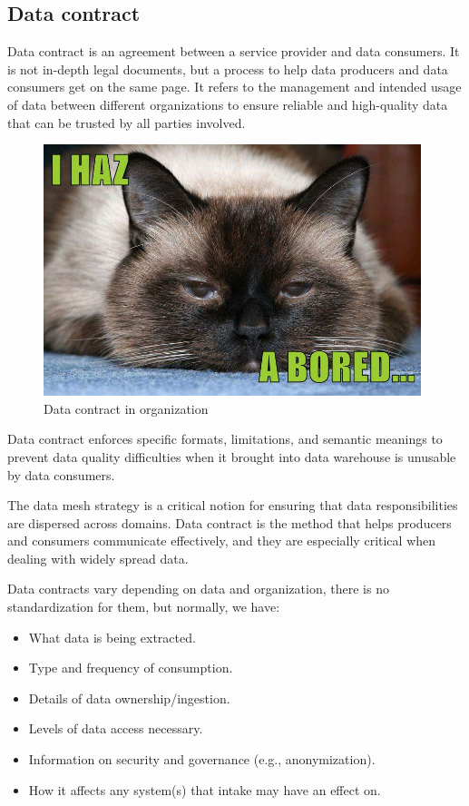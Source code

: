 \documentclass[12pt, a4paper]{book}
\begin{document}
\subsection{Data contract}
Data contract is an agreement between a service provider and data consumers. It is not in-depth legal documents, but a process to help data producers and data consumers get on the same page. It refers to the management and intended usage of data between different organizations to ensure reliable and high-quality data that can be trusted by all parties involved. \cite{contract}

\begin{figure}[h]
	\begin{framed}
		\centering
		\includegraphics[width=11cm]{boring.jpg}
		\caption{Data contract in organization}
		\label{datacontract}
	\end{framed}
\end{figure}

Data contract enforces specific formats, limitations, and semantic meanings to prevent data quality difficulties when it brought into data warehouse is unusable by data consumers.

The data mesh strategy is a critical notion for ensuring that data responsibilities are dispersed across domains. Data contract is the method that helps producers and consumers communicate effectively, and they are especially critical when dealing with widely spread data.

Data contracts vary depending on data and organization, there is no standardization for them, but normally, we have:
	\begin{itemize}
		\item What data is being extracted.
		\item Type and frequency of consumption.
		\item Details of data ownership/ingestion.
		\item Levels of data access necessary.
		\item Information on security and governance (e.g., anonymization).
		\item How it affects any system(s) that intake may have an effect on.
	\end{itemize}
\end{document}
